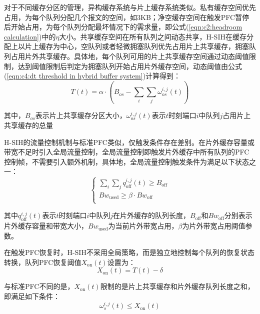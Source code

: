 对于不同缓存分区的管理，异构缓存系统与片上缓存系统类似。私有缓存空间优先占用，为每个队列分配几个报文的空间，如3KB；净空缓存空间在触发PFC暂停后开始占用，为每个队列分配最坏情况下的需求量，即公式(\ref{eqn:c2:headroom calculation})中的$\eta$大小。共享缓存空间在所有队列之间动态共享，H-SIH在缓存分配上以片上缓存为中心，空队列或者轻微拥塞队列优先占用片上共享缓存，拥塞队列占用片外共享缓存。具体地，每个队列可用的片上共享缓存空间通过动态阈值限制，达到阈值限制后判定为拥塞队列开始占用片外缓存空间，动态阈值由公式(\ref{eqn:c4:dt threshold in hybrid buffer system})计算得到：
\begin{equation}
  T(t)=\alpha \cdot (B_{os} - \sum_{i} \sum_{j} \omega_{os}^{i,j}(t))
  \label{eqn:c4:dt threshold in hybrid buffer system}
\end{equation}

\noindent 其中，$B_{os}$表示片上共享缓存分区大小，$\omega_{os}^{i,j}(t)$表示$t$时刻端口$i$中队列$j$占用片上共享缓存的总量

H-SIH的流量控制机制与标准PFC类似，仅触发条件存在差别。在片外缓存容量或带宽不足时引入全局流量控制，全局流量控制即触发片外缓存中所有队列的PFC控制帧，不需要引入额外机制，具体地，全局流量控制触发条件为满足以下状态之一：
\begin{equation}
  \begin{cases}
    \sum_{i} \sum_{j} q^{i,j}_{\text{off}}(t) \geqslant B_{\text{off}} \\
    Bw_{\text{used}} \geqslant \beta \cdot Bw_{\text{off}} \\
  \end{cases}
  \label{eqn:c4:global pause invoke condition}
\end{equation}

\noindent 其中$q^{i,j}_{\text{off}}(t)$表示$t$时刻端口$i$中队列$j$在片外缓存的队列长度，$B_{\text{off}}$和$Bw_{\text{off}}$分别表示片外缓存容量和带宽大小，$Bw_{\text{used}}$为当前片外带宽占用，$\beta$为片外带宽占用阈值参数。

在触发PFC恢复时，H-SIH不采用全局策略，而是独立地控制每个队列的恢复状态转换，队列PFC恢复阈值$X_{\text{on}}(t)$设置为：
\begin{equation}
  X_{\text{on}}(t) = T(t) - \delta
  \label{eqn:c4:pfc resume threshold}
\end{equation}

\noindent 与标准PFC不同的是，$X_{\text{on}}(t)$限制的是片上共享缓存和片外缓存队列长度之和，即满足如下条件：
\begin{equation}
  \omega_{s}^{i,j}(t) \leqslant X_{\text{on}}(t)
  \label{eqn:c4:resume condition}
\end{equation}


